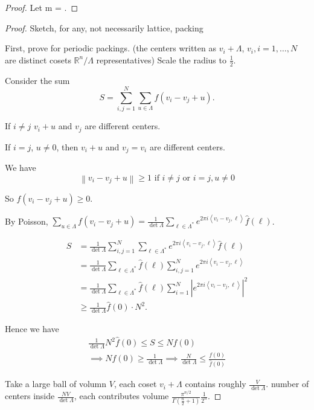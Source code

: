 \documentclass{report}
\newcommand{\R}{\mathbb{R}}
\newcommand{\inner}[2]{\left\langle #1, #2\right\rangle}
\newcommand{\norm}[1]{\left\| #1 \right\|}
\theoremstyle{definition}
\theoremstyle{remark}
\numberwithin{equation}{section}
\begin{document}
\begin{proof}
    Let m = .
\end{proof}

\begin{proof}
    Sketch, for any, not necessarily lattice, packing

    First, prove for periodic packings. (the centers written as $v_i + \Lambda$, $v_i, i = 1, \ldots, N$ are distinct cosets $\R^n /\Lambda$ representatives) Scale the radius to $\frac{1}{2}$.

    Consider the sum \[S = \sum_{i, j = 1}^N\sum_{u \in \Lambda} f(v_i - v_j + u).\]

    If $i \neq j$ $v_i + u$ and $v_j$ are different centers.

    If $i = j$, $u \neq 0$, then $v_i + u$ and $v_j = v_i$ are different centers.

    We have \[\norm{v_i - v_j + u} \geq 1 \text{ if } i \neq j \text{ or } i = j, u \neq 0\]

    So $f(v_i - v_j + u) \geq 0$.

    By Poisson, $\sum_{u \in \Lambda} f(v_i - v_j + u) = \frac{1}{\det \Lambda} \sum_{\ell \in \Lambda^*} e^{2\pi i \inner{v_i - v_j}{\ell}}\widehat{f}(\ell)$.

    \begin{align*}
        S & = \frac{1}{\det \Lambda} \sum_{i, j = 1}^N\sum_{\ell \in \Lambda^*}e^{2\pi i \inner{v_i - v_j}{\ell}}\widehat{f}(\ell) \\
        & = \frac{1}{\det \Lambda} \sum_{\ell \in \Lambda^*}\widehat{f}(\ell)\sum_{i, j = 1}^Ne^{2\pi i \inner{v_i - v_j}{\ell}} \\
        & = \frac{1}{\det \Lambda}\sum_{\ell \in \Lambda^*}\widehat{f}(\ell)\sum_{i = 1}^N \left|e^{2\pi i \inner{v_i - v_j}{\ell}}\right|^2 \\
        & \geq \frac{1}{\det \Lambda} \widehat{f}(0) \cdot N^2.
    \end{align*}
     
    Hence we have \begin{align*}
        \frac{1}{\det \Lambda} N^2 \widehat{f}(0) \leq S \leq N f(0) \\
        \implies N f(0) \geq \frac{1}{\det\Lambda} \implies \frac{N}{\det \Lambda} \leq \frac{f(0)}{\widehat{f}(0)}
    \end{align*}

    Take a large ball of volumn $V$, each coset $v_i + \Lambda$ contains roughly $\frac{V}{\det \Lambda}$. number of centers inside $\frac{NV}{\det \Lambda}$, each contributes volume $\frac{\pi^{n/2}}{\Gamma\left(\frac{n}{2}+1\right)}\frac{1}{2^n}$.


\end{proof}
\end{document}
